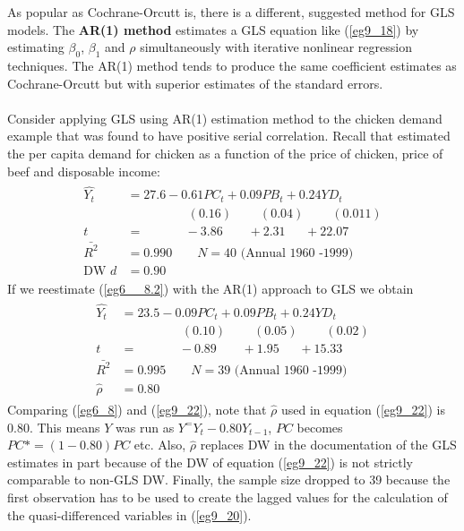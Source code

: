 \documentclass[11pt]{article}
\begin{document}
As popular as Cochrane-Orcutt is, there is a different, suggested method for GLS models. The \textbf{AR(1) method} estimates a GLS equation like (\ref{eg9_18}) by estimating $\beta_0$, $\beta_1$ and $\rho$ simultaneously with iterative nonlinear regression techniques. The AR(1) method tends to produce the same coefficient estimates as Cochrane-Orcutt but with superior estimates of the standard errors.\\ \\
Consider applying GLS using AR(1) estimation method to the chicken demand example that was found to have positive serial correlation. Recall that estimated the per capita demand for chicken as a function of the price of chicken, price of beef and disposable income:
\begin{align}
\label{eg6_8.2}
\begin{split}
\hat{Y_t} &= 27.6 - {0.61PC_t} + {0.09PB_t} + {0.24YD_t}\\
&\>\>\>\>\>\>\>\>\>\>\>\>\>\>\>\>\>\>\>\>\>\> (0.16) 
\>\>\>\>\>\>\>\>\>\> (0.04)
\>\>\>\>\>\>\>\>\>\> (0.011)\\
t&=\>\>\>\>\>\>\>\>\>\>\>\>\>\>\> -3.86 
\>\>\>\>\>\>\>\>\> +2.31
\>\>\>\>\>\>\> +22.07\\
\bar{R^2}&= 0.990 \quad\quad N=40 \text{  (Annual 1960 -1999)}
\\\text{DW } d &= 0.90
\end{split}
\end{align}
If we reestimate (\ref{eg6__8.2}) with the AR(1) approach to GLS we obtain
\begin{align}
\label{eg9_22}
\begin{split}
\hat{Y_t} &= 23.5 - {0.09PC_t} + {0.09PB_t} + {0.24YD_t}\\
&\>\>\>\>\>\>\>\>\>\>\>\>\>\>\>\>\>\>\>\>\>\> (0.10) 
\>\>\>\>\>\>\>\>\>\> (0.05)
\>\>\>\>\>\>\>\>\>\> (0.02)\\
t&=\>\>\>\>\>\>\>\>\>\>\>\>\>\>\> -0.89
\>\>\>\>\>\>\>\>\> +1.95
\>\>\>\>\>\>\> +15.33\\
\bar{R^2}&= 0.995 \quad\quad N=39 \text{  (Annual 1960 -1999)}
\\ \hat{\rho}&= 0.80
\end{split}
\end{align}
Comparing (\ref{eg6_8}) and (\ref{eg9_22}), note that $\hat{\rho}$ used in equation (\ref{eg9_22}) is 0.80. This means $Y$ was run as $Y^ = Y_t - 0.80Y_{t-1}$, $PC$ becomes $PC* = (1-0.80) PC$ etc. Also, $\hat{\rho}$ replaces DW in the documentation of the GLS estimates in part because of the DW of equation (\ref{eg9_22}) is not strictly comparable to non-GLS DW. Finally, the sample size dropped to 39 because the first observation has to be used to create the lagged values for the calculation of the quasi-differenced variables in (\ref{eg9_20}).\\ \\
\end{document}
